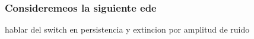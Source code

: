 \begin{frame}
    \frametitle{Consideremeos la siguiente ede}
    hablar del switch en persistencia y extincion
    por amplitud de ruido
\end{frame}